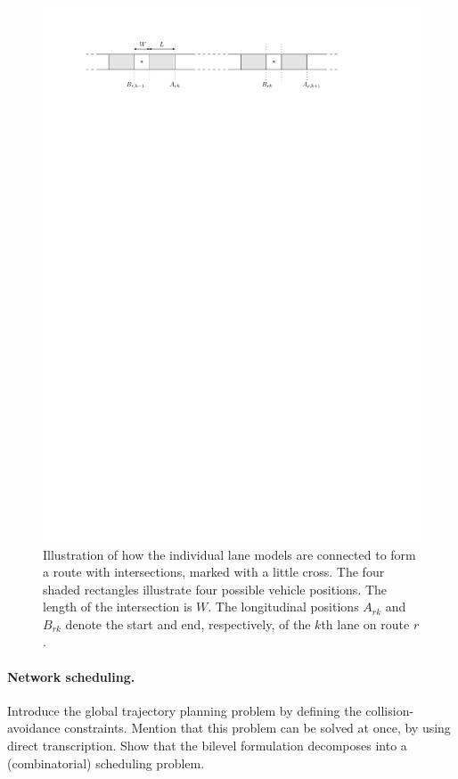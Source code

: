\documentclass[a4paper]{report}
\theoremstyle{definition}
\theoremstyle{plain}
\begin{document}
\begin{figure}
  \centering
  \includegraphics[scale=1]{figures/motion/intersection}
  \caption{Illustration of how the individual lane models are connected to form
    a route with intersections, marked with a little cross. The four shaded
    rectangles illustrate four possible vehicle positions. The length of the
    intersection is $W$. The longitudinal positions $A_{rk}$ and $B_{rk}$ denote
    the start and end, respectively, of the $k$th lane on route $r$.}%
  \label{fig:intersections}
\end{figure}

\paragraph{Network scheduling.}
Introduce the global trajectory planning problem by defining the
collision-avoidance constraints.
Mention that this problem can be solved at once, by using direct transcription.
%
Show that the bilevel formulation decomposes into a (combinatorial) scheduling
problem.
\end{document}
